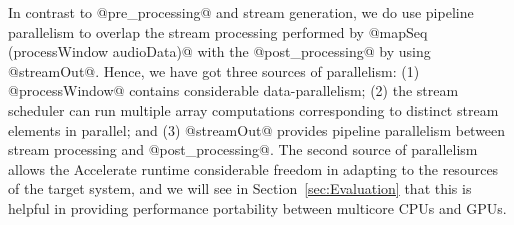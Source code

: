 In contrast to @pre_processing@ and stream generation, we do use pipeline parallelism to overlap the stream processing performed by @mapSeq (processWindow audioData)@ with the @post_processing@ by using @streamOut@. Hence, we have got three sources of parallelism: (1) @processWindow@ contains considerable data-parallelism; (2) the stream scheduler can run multiple array computations corresponding to distinct stream elements in parallel; and (3) @streamOut@ provides pipeline parallelism between stream processing and @post_processing@. The second source of parallelism allows the Accelerate runtime considerable freedom in adapting to the resources of the target system, and we will see in Section~\ref{sec:Evaluation} that this is helpful in providing performance portability between multicore CPUs and GPUs.

